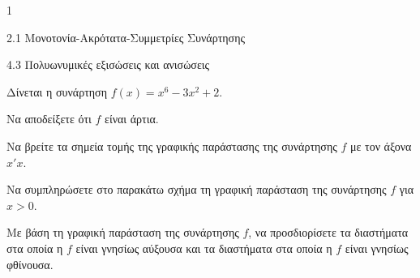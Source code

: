 \begin{ylh}{1}
\item 2.1 Μονοτονία-Ακρότατα-Συμμετρίες Συνάρτησης
\item 4.3 Πολυωνυμικές εξισώσεις και ανισώσεις
\end{ylh}
Δίνεται η συνάρτηση $f(x) = x^{6} - 3x^{2} + 2$.
\begin{alist}
\item Να αποδείξετε ότι $f$ είναι άρτια.
\item Να βρείτε τα σημεία τομής της γραφικής παράστασης της συνάρτησης $f$ με τον άξονα $x'x$.
\item Να συμπληρώσετε στο παρακάτω σχήμα τη γραφική παράσταση της συνάρτησης $f$ για $x > 0$.
\begin{center}
\end{center}
\item Με βάση τη γραφική παράσταση της συνάρτησης $f$, να προσδιορίσετε τα διαστήματα στα οποία η $f$ είναι γνησίως αύξουσα και τα διαστήματα στα οποία η $f$ είναι γνησίως φθίνουσα.
\end{alist}

